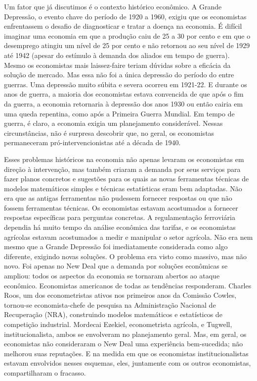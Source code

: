 \documentclass[12pt]{article}
\begin{document}
Um fator que já discutimos é o contexto histórico econômico. A Grande Depressão, o evento chave do período de 1920 a 1960, exigiu que os economistas enfrentassem o desafio de diagnosticar e tratar a doença na economia. É difícil imaginar uma economia em que a produção caiu de 25 a 30 por cento e em que o desemprego atingiu um nível de 25 por cento e não retornou ao seu nível de 1929 até 1942 (apesar do estímulo à demanda dos aliados em tempo de guerra). Mesmo os economistas mais laissez-faire teriam dúvidas sobre a eficácia da solução de mercado. Mas essa não foi a única depressão do período do entre guerras. Uma depressão muito súbita e severa ocorreu em 1921-22. E durante os anos de guerra, a maioria dos economistas estava convencida de que após o fim da guerra, a economia retornaria à depressão dos anos 1930 ou então cairia em uma queda repentina, como após a Primeira Guerra Mundial. Em tempo de guerra, é claro, a economia exigia um planejamento considerável. Nessas circunstâncias, não é surpresa descobrir que, no geral, os economistas permaneceram pró-intervencionistas até a década de 1940.

Esses problemas históricos na economia não apenas levaram os economistas em direção à intervenção, mas também criaram a demanda por seus serviços para fazer planos concretos e sugestões para os quais as novas ferramentas técnicas de modelos matemáticos simples e técnicas estatísticas eram bem adaptadas. Não era que as antigas ferramentas não pudessem fornecer respostas ou que não fossem ferramentas técnicas. Os economistas estavam acostumados a fornecer respostas específicas para perguntas concretas. A regulamentação ferroviária dependia há muito tempo da análise econômica das tarifas, e os economistas agrícolas estavam acostumados a medir e manipular o setor agrícola. Não era nem mesmo que a Grande Depressão foi imediatamente considerada como algo diferente, exigindo novas soluções. O problema era visto como massivo, mas não novo. Foi apenas no New Deal que a demanda por soluções econômicas se ampliou: todos os aspectos da economia se tornaram abertos ao ataque econômico. Economistas americanos de todas as tendências responderam. Charles Roos, um dos econometristas ativos nos primeiros anos da Comissão Cowles, tornou-se economista-chefe de pesquisa na Administração Nacional de Recuperação (NRA), construindo modelos matemáticos e estatísticos de competição industrial. Mordecai Ezekiel, econometrista agrícola, e Tugwell, institucionalista, ambos se envolveram no planejamento geral. Mas, em geral, os economistas não consideraram o New Deal uma experiência bem-sucedida; não melhorou suas reputações. E na medida em que os economistas institucionalistas estavam envolvidos nesses esquemas, eles, juntamente com os outros economistas, compartilharam o fracasso.
\end{document}
